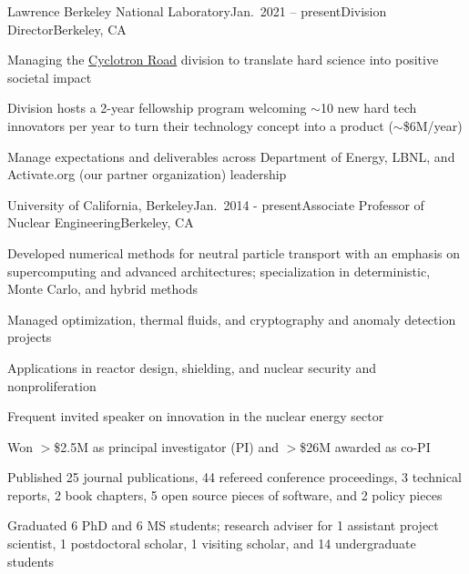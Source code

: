 \begin{rSubsection}{Lawrence Berkeley National Laboratory}{Jan.\ 2021 -- present}{Division Director}{Berkeley, CA}
\item Managing the \href{https://www.cyclotronroad.org/}{Cyclotron Road} division to translate hard science into positive societal impact
\item Division hosts a 2-year fellowship program welcoming $\sim$10 new hard tech innovators per year to turn their technology concept into a product ($\sim$\$6M/year)
\item Manage expectations and deliverables across Department of Energy, LBNL, and Activate.org (our partner organization) leadership
\end{rSubsection}

\begin{rSubsection}{University of California, Berkeley}{Jan.\ 2014 - present}{Associate Professor of Nuclear Engineering}{Berkeley, CA}
\item Developed numerical methods for neutral particle transport with an emphasis on supercomputing and advanced architectures; specialization in deterministic, Monte Carlo, and hybrid methods
\item Managed optimization, thermal fluids, and cryptography and anomaly detection projects
\item Applications in reactor design, shielding, and nuclear security and nonproliferation
\item Frequent invited speaker on innovation in the nuclear energy sector
\item Won $>$\$2.5M as principal investigator (PI) and $>$\$26M awarded as co-PI
\item Published 25 journal publications, 44 refereed conference proceedings, 3 technical reports, 2 book chapters, 5 open source pieces of software, and 2 policy pieces
\item Graduated 6 PhD and 6 MS students; research adviser for 1 assistant project scientist, 1 postdoctoral scholar, 1 visiting scholar, and 14 undergraduate students
\end{rSubsection}


